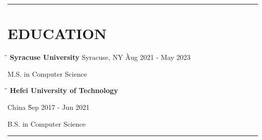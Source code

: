 \documentclass{res}
\begin{document}
 


\address{
    (315)-965-6606 $|$
    \href{mailto:wangtzuhsiang@gmail.com}{wangtzuhsiang@gmail.com} $|$ 
    \href{https://www.linkedin.com/in/zixiangwang/}{LinkedIn.com/in/zixiangwang/} $|$ 
    \href{https://github.com/DolorHunter}{GitHub.com/DolorHunter}
}

\begin{resume}
\vspace{-15pt}
\hspace{-0.55in}
\noindent\rule[0.25\baselineskip]{19.36cm}{1.2pt}    
\vspace{-20pt}  

\vspace{-0.1in}
\section{EDUCATION} 
    \vspace{0.00in}	 
    \begin{tabbing}
    \hspace{3.49in}\= \hspace{2in}\= \kill %
    {\bf Syracuse University} 
        \>Syracuse, NY \` Aug 2021 - May 2023
    \end{tabbing}\vspace{-18.5pt}      %
    M.S. in Computer Science      

    \vspace{-0.15in}	 
    \begin{tabbing}
    \hspace{3.7in}\= \hspace{2in}\= \kill %
    {\bf Hefei University of Technology } 
        
        \>China \` Sep 2017 - Jun 2021
    \end{tabbing}\vspace{-18.5pt}      %
    B.S. in Computer Science   

\vspace{-12pt}
\hspace{-0.55in}
\noindent\rule[0.25\baselineskip]{19.36cm}{0.5pt}    
      

\end{resume}
\end{document}
